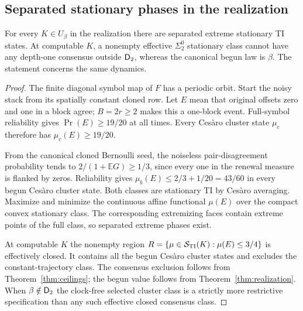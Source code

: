 \subsection{Separated stationary phases in the realization}
\begin{proposition}
\label{prop:divergence}
For every $K\in U_\beta$ in the realization there are separated
extreme stationary TI states. At computable $K$, a nonempty
effective $\Sigma^0_2$ stationary class cannot have any
depth-one consensus outside $\mathsf D_2$, whereas the canonical begun
law is $\beta$. The statement concerns the same dynamics.
\end{proposition}
\begin{proof}
The finite diagonal symbol map of $F$ has a periodic orbit.
Start the noisy stack from its spatially constant cloned row.
Let $E$ mean that original offsets zero and one in a block agree;
$B=2r\geq2$ makes this a one-block event. Full-symbol reliability
gives $\Pr(E)\geq19/20$ at all times. Every Ces\`aro cluster
state $\mu_c$ therefore has $\mu_c(E)\geq19/20$.

From the canonical cloned Bernoulli seed, the noiseless pair-disagreement
probability tends to $2/(1+\mathbb EG)\geq1/3$, since every one
in the renewal measure is flanked by zeros. Reliability gives
$\mu_b(E)\leq2/3+1/20=43/60$ in every begun Ces\`aro cluster
state. Both classes are stationary TI by Ces\`aro averaging.
Maximize and minimize the continuous affine functional $\mu(E)$
over the compact convex stationary class. The corresponding
extremizing faces contain extreme points of the full class,
so separated extreme phases exist.

At computable $K$ the nonempty region
$R=\{\mu\in\mathcal S_{\rm TI}(K):\mu(E)\leq3/4\}$ is effectively closed.
It contains all the begun Ces\`aro cluster states and excludes
the constant-trajectory class. The consensus exclusion follows
from Theorem~\ref{thm:ceilings}; the begun value follows from
Theorem~\ref{thm:realization}. When $\beta\notin\mathsf D_2$ the
clock-free selected cluster class is a strictly more restrictive
specification than any such effective closed consensus class.
\end{proof}

